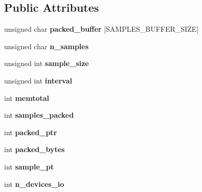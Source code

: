 \subsection*{Public Attributes}
\begin{DoxyCompactItemize}
\item 
\mbox{\label{classPacked__sample_a518e34a94d34e22fda56c507d3340d0b}} 
unsigned char {\bfseries packed\+\_\+buffer} \mbox{[}S\+A\+M\+P\+L\+E\+S\+\_\+\+B\+U\+F\+F\+E\+R\+\_\+\+S\+I\+ZE\mbox{]}
\item 
\mbox{\label{classPacked__sample_aeea86eede349aa3b326ff9a3429c6471}} 
unsigned char {\bfseries n\+\_\+samples}
\item 
\mbox{\label{classPacked__sample_a3105391c3cde9b950e15084d01dde53b}} 
unsigned int {\bfseries sample\+\_\+size}
\item 
\mbox{\label{classPacked__sample_a2cc83416e6da4f7d1dc9c6f81e2d0e21}} 
unsigned int {\bfseries interval}
\item 
\mbox{\label{classPacked__sample_ab3f4aae23ca8f98d196eed4ed24d53ff}} 
int {\bfseries memtotal}
\item 
\mbox{\label{classPacked__sample_ac4fb5c05bc915b237f9c0379f1d7a1f2}} 
int {\bfseries samples\+\_\+packed}
\item 
\mbox{\label{classPacked__sample_a6934c617b106c9442ec47f3e1e447e71}} 
int {\bfseries packed\+\_\+ptr}
\item 
\mbox{\label{classPacked__sample_a29a0b671003cff30a3358438dfe7b8dd}} 
int {\bfseries packed\+\_\+bytes}
\item 
\mbox{\label{classPacked__sample_aaa1a60cd02bf0c3ab049ba873a7bb55f}} 
int {\bfseries sample\+\_\+pt}
\item 
\mbox{\label{classPacked__sample_abd620c942a7a12ef35a919953aeae8d8}} 
int {\bfseries n\+\_\+devices\+\_\+io}
\item 
\mbox{\label{classPacked__sample_ac304b61fccf362cd6b63431ae6617aaf}} 

\end{DoxyCompactItemize}
